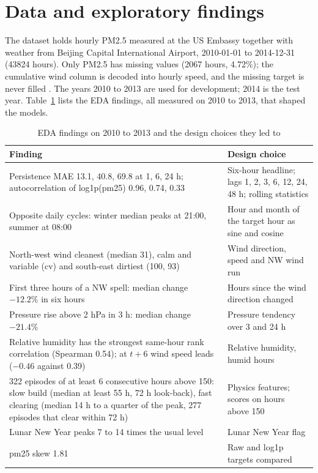 \documentclass[conference]{IEEEtran}
\begin{document}
\section{Data and exploratory findings}
\label{sec:data}
The dataset \cite{uci} holds hourly PM2.5 measured at the US Embassy together with weather from Beijing Capital International Airport, 2010-01-01 to 2014-12-31 (\num{43824} hours). Only PM2.5 has missing values (\num{2067} hours, 4.72\%); the cumulative wind column is decoded into hourly speed, and the missing target is never filled \cite{datareport}. The years 2010 to 2013 are used for development; 2014 is the test year. Table~\ref{tab:eda} lists the EDA findings, all measured on 2010 to 2013, that shaped the models.

\begin{table}[!htb]
\centering
\caption{EDA findings on 2010 to 2013 and the design choices they led to \cite{datareport}}
\label{tab:eda}
\begin{tabular}{@{}p{}p{}@{}}
\toprule
Finding & Design choice \\
\midrule
Persistence MAE 13.1, 40.8, 69.8 at 1, 6, 24 h; autocorrelation of log1p(pm25) 0.96, 0.74, 0.33 & Six-hour headline; lags 1, 2, 3, 6, 12, 24, 48 h; rolling statistics \\
Opposite daily cycles: winter median peaks at 21:00, summer at 08:00 & Hour and month of the target hour as sine and cosine \\
North-west wind cleanest (median 31), calm and variable (cv) and south-east dirtiest (100, 93) & Wind direction, speed and NW wind run \\
First three hours of a NW spell: median change $-12.2\%$ in six hours & Hours since the wind direction changed \\
Pressure rise above 2 hPa in 3 h: median change $-21.4\%$ & Pressure tendency over 3 and 24 h \\
Relative humidity has the strongest same-hour rank correlation (Spearman 0.54); at $t+6$ wind speed leads ($-0.46$ against 0.39) & Relative humidity, humid hours \\
322 episodes of at least 6 consecutive hours above 150: slow build (median at least 55 h, 72 h look-back), fast clearing (median 14 h to a quarter of the peak, 277 episodes that clear within 72 h) & Physics features; scores on hours above 150 \\
Lunar New Year peaks 7 to 14 times the usual level & Lunar New Year flag \\
pm25 skew 1.81 & Raw and log1p targets compared \\
\bottomrule
\end{tabular}
\end{table}
\end{document}
